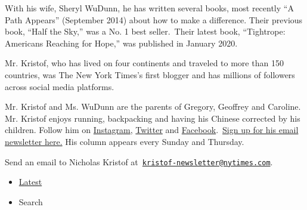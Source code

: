 With his wife, Sheryl WuDunn, he has written several books, most
recently ``A Path Appears'' (September 2014) about how to make a
difference. Their previous book, ``Half the Sky,'' was a No. 1 best
seller.~Their latest book, ``Tightrope: Americans Reaching for Hope,''
was published in January 2020.~

Mr. Kristof, who has lived on four continents and traveled to more than
150 countries, was The New York Times's first blogger and has millions
of followers across social media platforms.

Mr. Kristof and Ms. WuDunn are the parents of Gregory, Geoffrey and
Caroline. Mr. Kristof enjoys running, backpacking and having his Chinese
corrected by his children. Follow him on
\href{http://instagram.com/nickkristof}{Instagram},
\href{https://twitter.com/NickKristof}{Twitter} and
\href{https://www.facebook.com/kristof}{Facebook}.~\href{https://www.nytimes.com/newsletters/nicholas-kristof}{Sign
up for his email newsletter here.} His column appears every Sunday and
Thursday.

Send an email to Nicholas Kristof
at~\href{mailto:kristof-newsletter@nytimes.com}{\nolinkurl{kristof-newsletter@nytimes.com}}.

\begin{itemize}
\tightlist
\item
  \protect\hyperlink{stream-panel}{Latest}
\item
  Search
\end{itemize}

